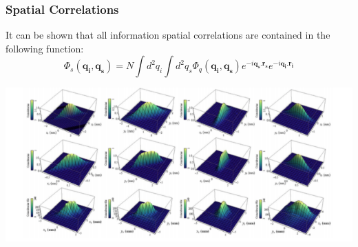\documentclass[]{beamer}
\begin{document}
\begin{frame}
\frametitle{Spatial Correlations}

It can be shown that all information spatial correlations are contained in the following function:
\begin{equation}
\Phi_{s}(\mathbf{q_{i}},\mathbf{q_{s}})=N \int d^{2}q_{i} \int d^{2}q_{s} \Phi_{q}(\mathbf{q_{i}},\mathbf{q_{s}}) e^{-i \mathbf{q_{s}}.\mathbf{r_{s}}} e^{-i \mathbf{q_{i}}.\mathbf{r_{i}}}
\end{equation}

\includegraphics[width=\textwidth]{images/correlations.png}

\end{frame}
\end{document}
